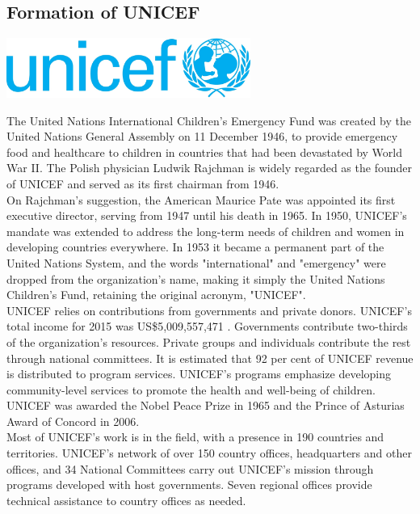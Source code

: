 \documentclass[11pt]{report}
\begin{document}
\subsection{Formation of UNICEF}
\vspace{2mm}\begin{center}\includegraphics[width=8cm]{./img/unicefLogo.jpg}\end{center}
The United Nations International Children's Emergency Fund was created by the United Nations General Assembly on 11 December 1946, to provide emergency food and healthcare to children in countries that had been devastated by World War II. The Polish physician Ludwik Rajchman is widely regarded as the founder of UNICEF and served as its first chairman from 1946.\\
On Rajchman's suggestion, the American Maurice Pate was appointed its first executive director, serving from 1947 until his death in 1965. In 1950, UNICEF's mandate was extended to address the long-term needs of children and women in developing countries everywhere. In 1953 it became a permanent part of the United Nations System, and the words "international" and "emergency" were dropped from the organization's name, making it simply the United Nations Children's Fund, retaining the original acronym, "UNICEF".\\
\indent UNICEF relies on contributions from governments and private donors. UNICEF's total income for 2015 was US\$5,009,557,471 . Governments contribute two-thirds of the organization's resources. Private groups and individuals contribute the rest through national committees. It is estimated that 92 per cent of UNICEF revenue is distributed to program services. UNICEF's programs emphasize developing community-level services to promote the health and well-being of children. UNICEF was awarded the Nobel Peace Prize in 1965 and the Prince of Asturias Award of Concord in 2006.\\
\indent Most of UNICEF's work is in the field, with a presence in 190 countries and territories. UNICEF's network of over 150 country offices, headquarters and other offices, and 34 National Committees carry out UNICEF's mission through programs developed with host governments. Seven regional offices provide technical assistance to country offices as needed.
\end{document}

